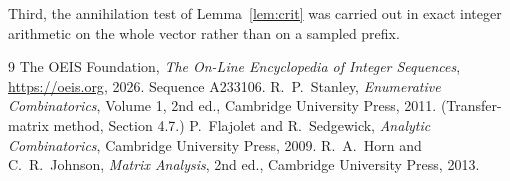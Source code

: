 \documentclass[11pt,a4paper]{article}
\theoremstyle{plain}
\theoremstyle{definition}
\begin{document}
Third, the annihilation test of Lemma~\ref{lem:crit} was carried out in exact integer
arithmetic on the whole vector rather than on a sampled prefix.

\begin{thebibliography}{9}
 The OEIS Foundation, \emph{The On-Line Encyclopedia of Integer
Sequences}, \url{https://oeis.org}, 2026. Sequence A233106.
 R.~P.~Stanley, \emph{Enumerative Combinatorics}, Volume 1, 2nd ed.,
Cambridge University Press, 2011. (Transfer-matrix method, Section 4.7.)
 P.~Flajolet and R.~Sedgewick, \emph{Analytic Combinatorics}, Cambridge
University Press, 2009.
 R.~A.~Horn and C.~R.~Johnson, \emph{Matrix Analysis}, 2nd ed., Cambridge
University Press, 2013.
\end{thebibliography}
\end{document}
